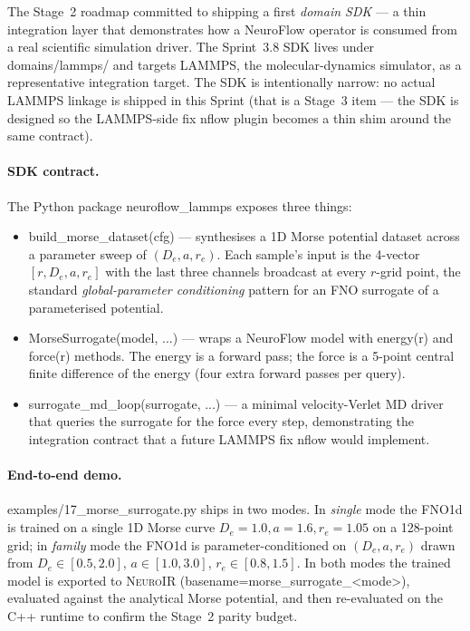 \documentclass[10pt,twocolumn]{article}
\renewcommand{\texttt}[1]{{\normalfont\ttfamily #1}\normalfont\rmfamily}
\newcommand{\neuroir}{\textsc{NeuroIR}}
\begin{document}
The Stage~2 roadmap committed to shipping a first
\emph{domain SDK} --- a thin integration layer that
demonstrates how a NeuroFlow operator is consumed from a
real scientific simulation driver.  The Sprint~3.8 SDK lives
under \texttt{domains/lammps/} and targets LAMMPS, the
molecular-dynamics simulator, as a representative
integration target.  The SDK is intentionally narrow:
no actual LAMMPS linkage is shipped in this Sprint (that is
a Stage~3 item --- the SDK is designed so the LAMMPS-side
\texttt{fix nflow} plugin becomes a thin shim around the
same contract).

\paragraph{SDK contract.}
The Python package \texttt{neuroflow\_lammps} exposes three
things:
\begin{itemize}
\item \texttt{build\_morse\_dataset(cfg)} — synthesises a
1D Morse potential dataset across a parameter sweep of
$(D_e, a, r_e)$.  Each sample's input is the 4-vector
$[r, D_e, a, r_e]$ with the last three channels broadcast
at every $r$-grid point, the standard
\emph{global-parameter conditioning} pattern for an FNO
surrogate of a parameterised potential.
\item \texttt{MorseSurrogate(model, ...)} — wraps a
NeuroFlow model with \texttt{energy(r)} and
\texttt{force(r)} methods.  The energy is a forward pass;
the force is a 5-point central finite difference of the
energy (four extra forward passes per query).
\item \texttt{surrogate\_md\_loop(surrogate, ...)} — a
minimal velocity-Verlet MD driver that queries the
surrogate for the force every step, demonstrating the
integration contract that a future LAMMPS
\texttt{fix nflow} would implement.
\end{itemize}

\paragraph{End-to-end demo.}
\texttt{examples/17\_morse\_surrogate.py} ships in two
modes.  In \emph{single} mode the FNO1d is trained on a
single 1D Morse curve $D_e=1.0, a=1.6, r_e=1.05$ on a
128-point grid; in \emph{family} mode the FNO1d is
parameter-conditioned on $(D_e, a, r_e)$ drawn from
$D_e\in[0.5, 2.0]$, $a\in[1.0, 3.0]$, $r_e\in[0.8, 1.5]$.
In both modes the trained model is exported to
\neuroir{} (\texttt{basename=morse\_surrogate\_<mode>}),
evaluated against the analytical Morse potential, and
then re-evaluated on the C{++} runtime to confirm the
Stage~2 parity budget.
\end{document}
